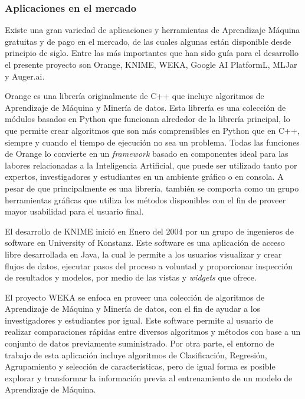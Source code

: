\subsubsection{Aplicaciones en el mercado}

Existe una gran variedad de aplicaciones y herramientas de Aprendizaje Máquina gratuitas y de pago en el mercado, de las cuales algunas están disponible desde principio de siglo. Entre las más importantes que han sido guía para el desarrollo el presente proyecto son Orange, KNIME, WEKA, Google AI PlatformL, MLJar y Auger.ai.

\begin{APAitemize}
    \item Orange \parencite{Demsar2004} es una librería originalmente de C++ que incluye algoritmos de Aprendizaje de Máquina y Minería de datos. Esta librería es una colección de módulos basados en Python que funcionan alrededor de la librería principal, lo que permite crear algoritmos que son más comprensibles en Python que en C++, siempre y cuando el tiempo de ejecución no sea un problema. Todas las funciones de Orange lo convierte en un \textit{framework} basado en componentes ideal para las labores relacionadas a la Inteligencia Artificial, que puede ser utilizado tanto por expertos, investigadores y estudiantes en un ambiente gráfico o en consola. A pesar de que principalmente es una librería, también se comporta como un grupo herramientas gráficas que utiliza los métodos disponibles con el fin de proveer mayor usabilidad para el usuario final.
    \item El desarrollo de KNIME \parencite{BCDG07} inició en Enero del 2004 por un grupo de ingenieros de software en University of Konstanz. Este software es una aplicación de acceso libre desarrollada en Java, la cual le permite a los usuarios visualizar y crear flujos de datos, ejecutar pasos del proceso a voluntad y proporcionar inspección de resultados y modelos, por medio de las vistas y \textit{widgets} que ofrece.
    \item El proyecto WEKA \parencite{Hall2009} se enfoca en proveer una colección de algoritmos de Aprendizaje de Máquina y Minería de datos, con el fin de ayudar a los investigadores y estudiantes por igual. Este software permite al usuario de realizar comparaciones rápidas entre diversos algoritmos y métodos con base a un conjunto de datos previamente suministrado. Por otra parte, el entorno de trabajo de esta aplicación incluye algoritmos de Clasificación, Regresión, Agrupamiento y selección de características, pero de igual forma es posible explorar y transformar la información previa al entrenamiento de un modelo de Aprendizaje de Máquina.

\end{APAitemize}
